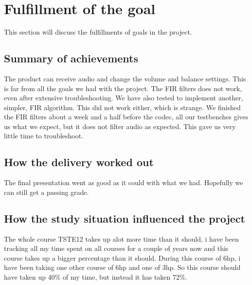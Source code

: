 \section{Fulfillment of the goal}
This section will discuss the fulfillments of goals in the project.

\subsection{Summary of achievements}
The product can receive audio and change the volume and balance settings. This is far from all the goals we had with the project. The FIR filters does not work, even after extensive troubleshooting. We have also tested to implement another, simpler, FIR algorithm. This did not work either, which is strange. We finished the FIR filters about a week and a half before the codec, all our testbenches gives us what we expect, but it does not filter audio as expected. This gave us very little time to troubleshoot.

\subsection{How the delivery worked out}
The final presentation went as good as it could with what we had. Hopefully we can still get a passing grade.

\subsection{How the study situation influenced the project}
The whole course TSTE12 takes up alot more time than it should, i have been tracking all my time spent on all courses for a couple of years now and this course takes up a bigger percentage than it should. During this course of 6hp, i have been taking one other course of 6hp and one of 3hp. So this course should have taken up 40\% of my time, but instead it has taken 72\%. 